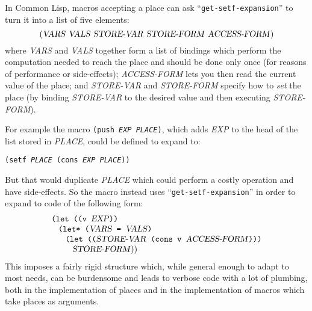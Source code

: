 \documentclass[format=acmsmall, review]{acmart}
\makeatletter
\newcommand \MAlign [1] {\begin{array}{@{}l@{}}#1\end{array}}
\newcommand \id[1] {\textrm{\textsl{#1}}}
\makeatother
\begin{document}
In Common Lisp, macros accepting a place can ask ``\texttt{get-setf-expansion}''
to turn it into a list of five elements:
\begin{displaymath}
  (\id{VARS}~\id{VALS}~\id{STORE-VAR}~\id{STORE-FORM}
  ~\id{ACCESS-FORM})
\end{displaymath}
where \id{VARS} and \id{VALS} together form a list of bindings which perform
the computation needed to reach the place and should be done only once
(for reasons of performance or side-effects); \id{ACCESS-FORM} lets you then
read the current value of the place; and \id{STORE-VAR} and \id{STORE-FORM}
specify how to \emph{set} the place (by binding \id{STORE-VAR} to the
desired value and then executing \id{STORE-FORM}).

For example the macro \texttt{(push \id{EXP} \id{PLACE})}, which adds
\id{EXP} to the head of the list stored in \id{PLACE}, could be defined to
expand to:
%
\begin{center}
\texttt{(setf \id{PLACE} (cons \id{EXP} \id{PLACE}))}
\end{center}
%
But that would duplicate \id{PLACE} which could perform a costly operation
and have side-effects.  So the macro instead uses
``\texttt{get-setf-expansion}'' in order to expand to code of the following
form:
\begin{displaymath}
  \MAlign{
    \texttt{(let ((v \id{EXP}))} \\
    \;\;\;\MAlign{
      \texttt{(let* (\id{VARS} = \id{VALS})} \\
      \;\;\;\MAlign{
        \texttt{(let ((\id{STORE-VAR} (cons v \id{ACCESS-FORM})))} \\
        \;\;\;\id{STORE-FORM}))}}}
\end{displaymath}
This imposes a fairly rigid structure which, while general enough to adapt
to most needs, can be burdensome and leads to verbose code with a lot
of plumbing, both in the implementation of places and in the implementation
of macros which take places as arguments.
\end{document}
